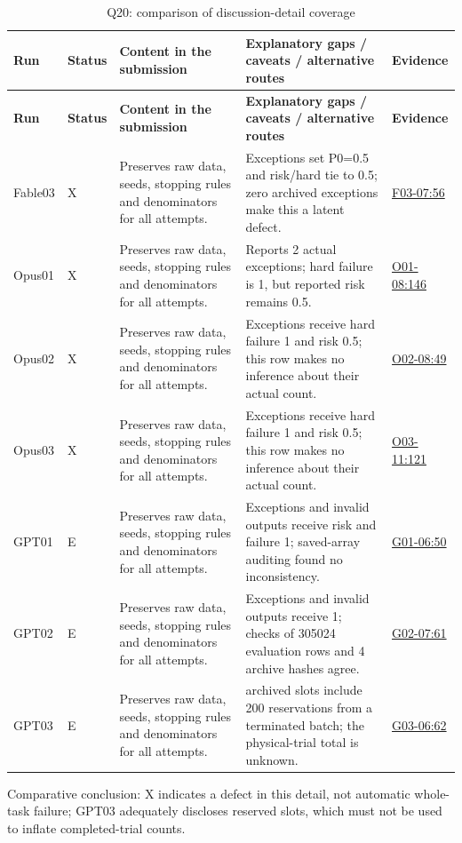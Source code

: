 \documentclass[11pt,a4paper]{article}
\begin{document}
{\fontsize{9.0}{12.6}\selectfont
\setlength{\tabcolsep}{2.5pt}
\begin{longtable}{>{\raggedright\arraybackslash}p{}>{\raggedright\arraybackslash}p{}>{\raggedright\arraybackslash}p{}>{\raggedright\arraybackslash}p{}>{\raggedright\arraybackslash}p{}}
\caption{Q20: comparison of discussion-detail coverage}\\
\toprule
\textbf{Run} & \textbf{Status} & \textbf{Content in the submission} & \textbf{Explanatory gaps /\allowbreak{} caveats /\allowbreak{} alternative routes} & \textbf{Evidence}\tabularnewline
\midrule
\endfirsthead
\toprule
\textbf{Run} & \textbf{Status} & \textbf{Content in the submission} & \textbf{Explanatory gaps /\allowbreak{} caveats /\allowbreak{} alternative routes} & \textbf{Evidence}\tabularnewline
\midrule
\endhead
{}Fable03 & X & Preserves raw data,\allowbreak{} seeds,\allowbreak{} stopping rules and denominators for all attempts. & Exceptions set P0=0.5 and risk/\allowbreak{}hard tie to 0.5; zero archived exceptions make this a latent defect. & \hyperref[src:F03-07]{F03-07:56}\tabularnewline
{}Opus01 & X & Preserves raw data,\allowbreak{} seeds,\allowbreak{} stopping rules and denominators for all attempts. & Reports 2 actual exceptions; hard failure is 1,\allowbreak{} but reported risk remains 0.5. & \hyperref[src:O01-08]{O01-08:146}\tabularnewline
{}Opus02 & X & Preserves raw data,\allowbreak{} seeds,\allowbreak{} stopping rules and denominators for all attempts. & Exceptions receive hard failure 1 and risk 0.5; this row makes no inference about their actual count. & \hyperref[src:O02-08]{O02-08:49}\tabularnewline
{}Opus03 & X & Preserves raw data,\allowbreak{} seeds,\allowbreak{} stopping rules and denominators for all attempts. & Exceptions receive hard failure 1 and risk 0.5; this row makes no inference about their actual count. & \hyperref[src:O03-11]{O03-11:121}\tabularnewline
{}GPT01 & E & Preserves raw data,\allowbreak{} seeds,\allowbreak{} stopping rules and denominators for all attempts. & Exceptions and invalid outputs receive risk and failure 1; saved-array auditing found no inconsistency. & \hyperref[src:G01-06]{G01-06:50}\tabularnewline
{}GPT02 & E & Preserves raw data,\allowbreak{} seeds,\allowbreak{} stopping rules and denominators for all attempts. & Exceptions and invalid outputs receive 1; checks of 305024 evaluation rows and 4 archive hashes agree. & \hyperref[src:G02-07]{G02-07:61}\tabularnewline
{}GPT03 & E & Preserves raw data,\allowbreak{} seeds,\allowbreak{} stopping rules and denominators for all attempts. & 340600 archived slots include 200 reservations from a terminated batch; the physical-trial total is unknown. & \hyperref[src:G03-06]{G03-06:62}\tabularnewline
\bottomrule
\end{longtable}
}
Comparative conclusion: X indicates a defect in this detail,\allowbreak{} not automatic whole-task failure; GPT03 adequately discloses reserved slots,\allowbreak{} which must not be used to inflate completed-trial counts.
\end{document}
